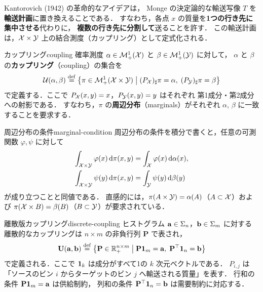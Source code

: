 Kantorovich (1942) の革命的なアイデアは，
Monge の決定論的な輸送写像 $T$ を\textbf{輸送計画}に置き換えることである．
すなわち，各点 $x$ の質量を\textbf{1つの行き先に集中させる}代わりに，
\textbf{複数の行き先に分割して}送ることを許す．
この輸送計画は，$\mathcal{X} \times \mathcal{Y}$ 上の結合測度（カップリング）として定式化される．

\begin{definition}{カップリング}{coupling}
  確率測度 $\alpha \in \mathcal{M}_+^1(\mathcal{X})$ と $\beta \in \mathcal{M}_+^1(\mathcal{Y})$ に対して，
  $\alpha$ と $\beta$ の\textbf{カップリング}（coupling）の集合を
  \[
    \mathcal{U}(\alpha, \beta) \overset{\mathrm{def}}{=}
    \left\{ \pi \in \mathcal{M}_+^1(\mathcal{X} \times \mathcal{Y}) \;\middle|\;
    (P_{\mathcal{X}})_\sharp \pi = \alpha, \;
    (P_{\mathcal{Y}})_\sharp \pi = \beta \right\}
  \]
  で定義する．ここで $P_{\mathcal{X}}(x, y) = x$，$P_{\mathcal{Y}}(x, y) = y$ はそれぞれ
  第1成分・第2成分への射影である．
  すなわち，$\pi$ の\textbf{周辺分布}（marginals）がそれぞれ $\alpha$, $\beta$ に一致することを要求する．
\end{definition}

\begin{remark}{周辺分布の条件}{marginal-condition}
  周辺分布の条件を積分で書くと，任意の可測関数 $\varphi, \psi$ に対して
  \begin{align*}
    \int_{\mathcal{X} \times \mathcal{Y}} \varphi(x) \, \mathrm{d}\pi(x, y) &= \int_{\mathcal{X}} \varphi(x) \, \mathrm{d}\alpha(x), \\
    \int_{\mathcal{X} \times \mathcal{Y}} \psi(y) \, \mathrm{d}\pi(x, y) &= \int_{\mathcal{Y}} \psi(y) \, \mathrm{d}\beta(y)
  \end{align*}
  が成り立つことと同値である．
  直感的には，$\pi(A \times \mathcal{Y}) = \alpha(A)$（$A \subset \mathcal{X}$）および
  $\pi(\mathcal{X} \times B) = \beta(B)$（$B \subset \mathcal{Y}$）が要求されている．
\end{remark}

\begin{remark}{離散版カップリング}{discrete-coupling}
  ヒストグラム $\mathbf{a} \in \Sigma_n$，$\mathbf{b} \in \Sigma_m$ に対する
  離散的なカップリングは $n \times m$ の非負行列 $\mathbf{P}$ で表され，
  \[
    \mathbf{U}(\mathbf{a}, \mathbf{b}) \overset{\mathrm{def}}{=}
    \left\{ \mathbf{P} \in \mathbb{R}_+^{n \times m} \;\middle|\;
    \mathbf{P} \mathbf{1}_m = \mathbf{a}, \;
    \mathbf{P}^\top \mathbf{1}_n = \mathbf{b} \right\}
  \]
  で定義される．ここで $\mathbf{1}_k$ は成分がすべて1の $k$ 次元ベクトルである．
  $P_{i,j}$ は「ソースのビン $i$ からターゲットのビン $j$ へ輸送される質量」を表す．
  行和の条件 $\mathbf{P} \mathbf{1}_m = \mathbf{a}$ は供給制約，
  列和の条件 $\mathbf{P}^\top \mathbf{1}_n = \mathbf{b}$ は需要制約に対応する．
\end{remark}

